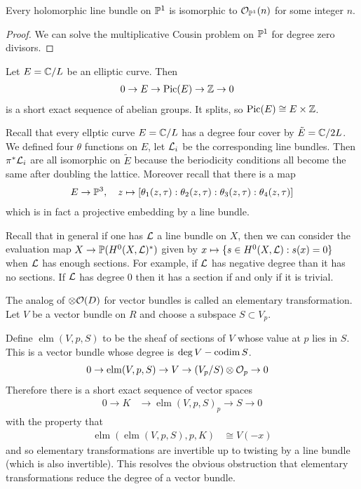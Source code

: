 \documentclass[12pt]{article}
\begin{document}
\begin{proposition}
    Every holomorphic line bundle on $\P^1$ is isomorphic to $\mathcal{O}_{\P^1}(n)$ for some integer $n$.
\end{proposition}

\begin{proof}
    We can solve the multiplicative Cousin problem on $\P^1$ for degree zero divisors.
\end{proof}

\begin{proposition}
    Let $E = \C/L$ be an elliptic curve. Then \begin{align*}
        0 \to E & \to \Pic(E) \to \Z \to 0 
    \end{align*}
    is a short exact sequence of abelian groups. It splits, so $\Pic(E) \cong E \times \Z$.
\end{proposition}

\begin{example}
     Recall that every ellptic curve $E = \C/L$ has a degree four cover by $\tilde E = \C/2L$. We defined four $\theta$ functions on $E$, let $\cL_i$ be the corresponding line bundles. Then $\pi^*\cL_i$ are all isomorphic on $\tilde E$ because the beriodicity conditions all become the same after doubling the lattice. Moreover recall that there is a map \begin{align*}
        E \to \P^3, \quad z \mapsto [\theta_1(z,\tau):\theta_2(z,\tau):\theta_3(z,\tau):\theta_4(z,\tau)]
    \end{align*} which is in fact a projective embedding by a line bundle.
\end{example}
Recall that in general if one has $\cL$ a line bundle on $X$, then we can consider the evaluation map $X \to \P(H^0(X,\cL)^*)$ given by $x \mapsto \{s \in H^0(X,\cL) : s(x)=0\}$ when $\cL$ has enough sections. For example, if $\cL$ has negative degree than it has no sections. If $\cL$ has degree $0$ then it has a section if and only if it is trivial. 

The analog of $\otimes \cO(D)$ for vector bundles is called an elementary transformation. Let $V$ be a vector bundle on $R$ and choose a subspace $S\subset V_p$. 

Define $\operatorname{elm}(V,p,S)$ to be the sheaf of sections of $V$ whose value at $p$ lies in $S$. This is a vector bundle whose degree is $\deg V - \codim S$.
\begin{align*}
    0 \to \operatorname{elm}(V,p,S) & \to V \to (V_p/S) \otimes \cO_p \to 0
\end{align*} Therefore there is a short exact sequence of vector spaces \begin{align*}
    0 \to K & \to \operatorname{elm}(V,p,S)_p \to S \to 0
\end{align*} with the property that \begin{align*}
    \operatorname{elm}(\operatorname{elm}(V,p,S),p,K) & \cong V(-x)
\end{align*} and so elementary transformations are invertible up to twisting by a line bundle (which is also invertible). This resolves the obvious obstruction that elementary transformations reduce the degree of a vector bundle.
\end{document}

